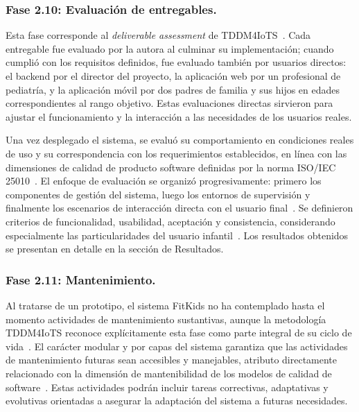				\subsubsection{Fase 2.10: Evaluación de entregables.}
					Esta fase corresponde al \textit{deliverable assessment} de TDDM4IoTS~\cite{GuerreroUlloa2024}. Cada entregable fue evaluado por la autora al culminar su implementación; cuando cumplió con los requisitos definidos, fue evaluado también por usuarios directos: el backend por el director del proyecto, la aplicación web por un profesional de pediatría, y la aplicación móvil por dos padres de familia y sus hijos en edades correspondientes al rango objetivo. Estas evaluaciones directas sirvieron para ajustar el funcionamiento y la interacción a las necesidades de los usuarios reales.
					
					Una vez desplegado el sistema, se evaluó su comportamiento en condiciones reales de uso y su correspondencia con los requerimientos establecidos, en línea con las dimensiones de calidad de producto software definidas por la norma ISO/IEC 25010~\cite{ISO25010,GuerreroUlloa2024}. El enfoque de evaluación se organizó progresivamente: primero los componentes de gestión del sistema, luego los entornos de supervisión y finalmente los escenarios de interacción directa con el usuario final~\cite{GuerreroUlloa2024,Nielsen1994}. Se definieron criterios de funcionalidad, usabilidad, aceptación y consistencia, considerando especialmente las particularidades del usuario infantil~\cite{Hourcade2015,Bangor2009}. Los resultados obtenidos se presentan en detalle en la sección de Resultados.
					
				\subsubsection{Fase 2.11: Mantenimiento.}
					Al tratarse de un prototipo, el sistema FitKids no ha contemplado hasta el momento actividades de mantenimiento sustantivas, aunque la metodología TDDM4IoTS reconoce explícitamente esta fase como parte integral de su ciclo de vida~\cite{GuerreroUlloa2024}. El carácter modular y por capas del sistema garantiza que las actividades de mantenimiento futuras sean accesibles y manejables, atributo directamente relacionado con la dimensión de mantenibilidad de los modelos de calidad de software~\cite{Fowler2002}. Estas actividades podrán incluir tareas correctivas, adaptativas y evolutivas orientadas a asegurar la adaptación del sistema a futuras necesidades.
					
